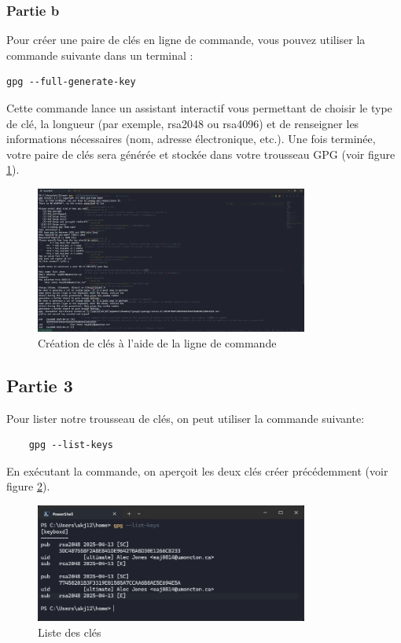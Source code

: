 \documentclass[12pt,a4paper]{article}
\begin{document}
\subsubsection{Partie b}
Pour créer une paire de clés en ligne de commande, vous pouvez utiliser la commande suivante dans un terminal :

\begin{verbatim}
gpg --full-generate-key
\end{verbatim}

Cette commande lance un assistant interactif vous permettant de choisir le type de clé, la longueur (par exemple, rsa2048 ou rsa4096)
et de renseigner les informations nécessaires (nom, adresse électronique, etc.). Une fois terminée, votre paire de clés sera générée et stockée dans votre trousseau GPG (voir figure \ref{newKey_cli}).

\begin{figure}[ht]
    \centering
    \includegraphics[width=0.8\textwidth]{../img/newKey_cli.png}
    \caption{Création de clés à l'aide de la ligne de commande}
    \label{newKey_cli}
\end{figure}

\subsection{Partie 3}
Pour lister notre trousseau de clés, on peut utiliser la commande suivante:
\begin{verbatim}
    gpg --list-keys
\end{verbatim}
En exécutant la commande, on aperçoit les deux clés créer précédemment (voir figure \ref{listKeys}).

\begin{figure}[ht]
    \centering
    \includegraphics[width=0.8\textwidth]{../img/listKeys.png}
    \caption{Liste des clés}
    \label{listKeys}
\end{figure}
\end{document}
